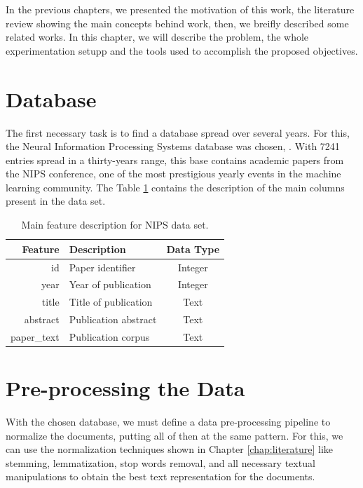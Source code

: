 In the previous chapters, we presented the motivation of this work, the literature review showing the main concepts behind work, then, we breifly described some related works. In this chapter, we will describe the problem, the whole experimentation setupp and the tools used to accomplish the proposed objectives.

\section{Database}

The first necessary task is to find a database spread over several years. For this, the Neural Information Processing Systems database was chosen, \cite{nipsweb}. With 7241 entries spread in a thirty-years range, this base contains academic papers from the NIPS conference, one of the most prestigious yearly events in the machine learning community. The Table \ref{tab:dataset-description} contains the description of the main columns present in the data set.

\begin{table}[h!]
	\centering
	\caption{Main feature description for NIPS data set.}
	\label{tab:dataset-description}
	\begin{tabular}{r|lc}
		\toprule
		    Feature & Description          & Data Type \\ \midrule
		         id & Paper identifier     &  Integer  \\
		       year & Year of publication  &  Integer  \\
		      title & Title of publication &   Text    \\
		   abstract & Publication abstract &   Text    \\
		paper\_text & Publication corpus   &   Text	   \\ \bottomrule
	\end{tabular}
\end{table}

\section{Pre-processing the Data}

With the chosen database, we must define a data pre-processing pipeline to normalize the documents, putting all of then at the same pattern. For this, we can use the normalization techniques shown in Chapter \ref{chap:literature} like stemming, lemmatization, stop words removal, and all necessary textual manipulations to obtain the best text representation for the documents.

